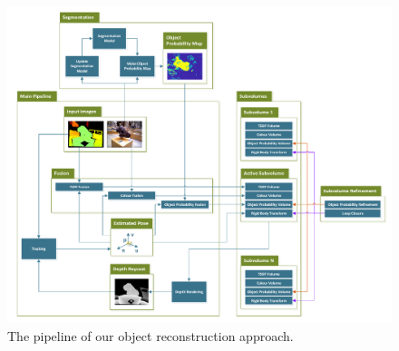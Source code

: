 \begin{figure}[!t]
	\centering
	\includegraphics[width=0.7\linewidth]{pipeline.pdf}
	\vspace{-3mm}
	\caption{The pipeline of our object reconstruction approach.}
	\label{pipelineDiagram}
\end{figure}

